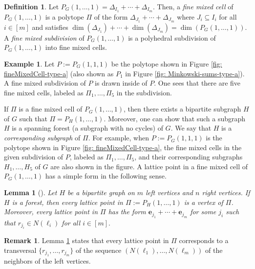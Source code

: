 \documentclass[12pt,reqno]{article}%
\newtheorem{lem}[thm]{Lemma}
\theoremstyle{definition}
\newtheorem{defn}[thm]{Definition}
\newtheorem{ex}[thm]{Example}
\newtheorem{rem}[thm]{Remark}
\numberwithin{equation}{section}
\newcommand{\bbe}{\mathbf{e}}
\begin{document}
\begin{defn}\label{def: mixed-subdivision}
    Let $P_G(1, \dots, 1) = \Delta_{I_{1}} + \cdots + \Delta_{I_{m}}$. Then, a \emph{fine mixed cell} of $P_G(1, \dots, 1)$ is a polytope $\Pi$ of the form $\Delta_{J_1} + \cdots + \Delta_{J_m}$ where $J_i \subseteq I_i$ for all $i \in [m]$ and satisfies $\dim(\Delta_{J_1}) + \cdots + \dim(\Delta_{J_m}) = \dim(P_G(1, \dots, 1)).$ A \emph{fine mixed subdivision} of $P_G(1,\dots, 1)$ is a polyhedral subdivision of $P_G(1,\dots,1)$ into fine mixed cells.
\end{defn}

\begin{ex}
    Let $P := P_G(1,1,1)$ be the polytope shown in Figure \ref{fig: fineMixedCell-type-a} (also shown as $P_1$ in Figure \ref{fig: Minkowski-sums-type-a}). A fine mixed subdivision of $P$ is drawn inside of $P$. One sees that there are five fine mixed cells, labeled as $\Pi_1, \dots, \Pi_5$ in the subdivision.
\end{ex}

If $\Pi$ is a fine mixed cell of $P_G(1, \dots, 1)$, then there exists a bipartite subgraph $H$ of $G$ such that $\Pi = P_H(1, \dots, 1)$. Moreover, one can show that such a subgraph $H$ is a spanning forest (a subgraph with no cycles) of $G$. We say that $H$ is a \emph{corresponding subgraph} of $\Pi$. For example, when $P := P_G(1,1,1)$ is the polytope shown in Figure \ref{fig: fineMixedCell-type-a}, the fine mixed cells in the given subdivision of $P$, labeled as $\Pi_1, \dots, \Pi_5$, and their corresponding subgraphs $H_1, \dots, H_5$ of $G$ are also shown in the figure. A lattice point in a fine mixed cell of $P_G(1,\dots, 1)$ has a simple form in the following sense.
\begin{lem}[\cite{Postnikov2005}]\label{lem: lattice-points-in-fine-mixed-cell}
    Let $H$ be a bipartite graph on $m$ left vertices and $n$ right vertices. If $H$ is a forest, then every lattice point in $\Pi:=P_{H}(1, \dots, 1)$ is a vertex of $\Pi$. Moreover, every lattice point in $\Pi$ has the form $\bbe_{j_{1}} + \cdots + \bbe_{j_m}$ for some $j_i$ such that $r_{j_i} \in N(\ell_i)$ for all $i \in [m].$ 
\end{lem}

\begin{rem}\label{rem: integers-in-fine-mixed-cells}
    Lemma \ref{lem: lattice-points-in-fine-mixed-cell} states that every lattice point in $\Pi$ corresponds to a transversal $\{r_{j_1}, \dots, r_{j_m}\}$ of the sequence $(N(\ell_1), \dots, N(\ell_m))$ of the neighbors of the left vertices.
\end{rem}
\end{document}
